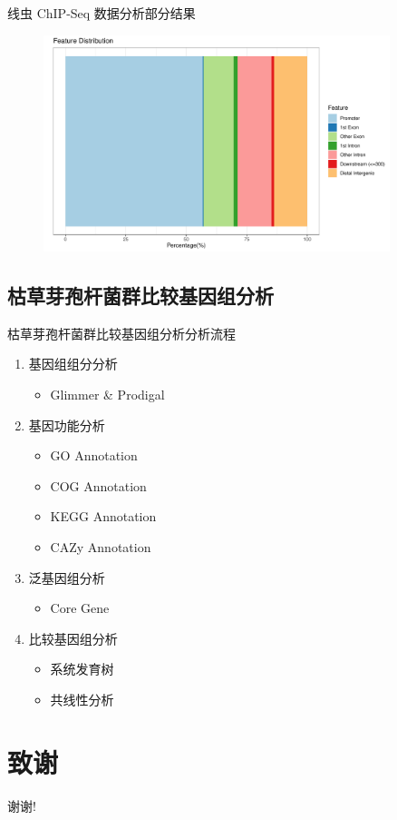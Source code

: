 \documentclass{beamer}
\begin{document}
\begin{frame}{线虫 ChIP-Seq 数据分析}{部分结果}
	\begin{figure}
		\centering
		\includegraphics[width=0.9\textwidth]{img/peaks_feature_distribution.pdf}
	\end{figure}
\end{frame}

\subsection{枯草芽孢杆菌群比较基因组分析}
\begin{frame}{枯草芽孢杆菌群比较基因组分析}{分析流程}
	\begin{enumerate}
		\item 基因组组分分析
		\begin{itemize}
			\item Glimmer \& Prodigal
		\end{itemize}
		\item 基因功能分析
		\begin{itemize}
			\item GO Annotation
			\item COG Annotation
			\item KEGG Annotation
			\item CAZy Annotation
		\end{itemize}
		\item 泛基因组分析
		\begin{itemize}
			\item Core Gene
		\end{itemize}
		\item 比较基因组分析
			\begin{itemize}
				\item 系统发育树
				\item 共线性分析
			\end{itemize}
	\end{enumerate}
\end{frame}

	\section*{致谢}
	\begin{frame}
		\begin{center}
			\textcolor{myNewColorA}{\huge 谢谢!}
		\end{center}
	\end{frame}
	
\end{document}
